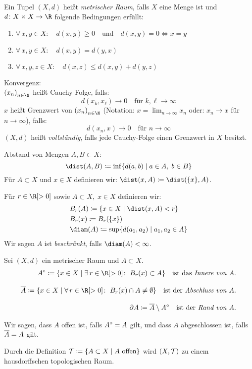 \begin{thEmpty}[Metrik]
    Ein Tupel $(X,d)$ heißt \emph{metrischer Raum}, falls $X$ eine Menge ist 
    und $d\colon X\times X\to\R$ folgende Bedingungen erfüllt:
    \begin{enumerate}[({M}1),leftmargin=2cm]
        \item
            $\forall\,x,y\in X\colon\quad
            d(x,y)\geq 0$~~und~~$d(x,y) = 0 \iff x=y$
        \item
            $\forall\,x,y\in X\colon\quad d(x,y) = d(y,x)$
        \item
            $\forall\,x,y,z\in X\colon\quad d(x,z)\leq d(x,y)+d(y,z)$
    \end{enumerate}
    
    Konvergenz:\\
    $\nSeq x$ heißt Cauchy-Folge, falls:
    \[ d(x_k,x_\ell) \to 0 \quad\text{für } k,\ell\to\infty \]
    $x$ heißt Grenzwert von $\nSeq x$ (Notation:
    $x=\lim_{n\to\infty} x_n$ oder: $x_n\to x$ für $n\to\infty$), falls:
    \[ d(x_n,x)\to 0 \quad\text{für } n\to\infty \]
    $(X,d)$ heißt \emph{vollständig}, falls jede Cauchy-Folge einen Grenzwert in
    $X$ besitzt.
    
    Abstand von Mengen $A,B\subset X$:
    \[ \dist(A,B) \defeq \inf \{ d(a,b) \Mid a\in A,\; b\in B \} \]
    Für $A\subset X$ und $x\in X$ definieren wir: $\dist(x,A) \defeq
    \dist(\{x\},A)$.
    
    Für $r\in\R[>0]$ sowie $A\subset X,\;x\in X$ definieren wir:
    \begin{align*}
        & B_r(A) \defeq \{ x\in X \Mid \dist(x,A) < r \}    \\
        & B_r(x) \defeq B_r(\{x\})                          \\
        & \diam(A) \defeq \sup \{ d(a_1,a_2) \Mid a_1,a_2\in A \}
    \end{align*}
    Wir sagen $A$ ist \emph{beschränkt}, falls $\diam(A)<\infty$.
\end{thEmpty}

\begin{thEmpty}\label{vl01:topometrik}
    Sei $(X,d)$ ein metrischer Raum und $A\subset X$.
    \begin{align*}
        \setinterior A \defeq \{ x\in X \Mid \exists\,r\in\R[>0]\colon\;
        B_r(x) \subset A \}
        \quad\text{ist das \emph{Innere von $A$}}.
        \\[2ex]
        \setclosure A \defeq \{ x\in X \Mid \forall\,r\in\R[>0]\colon\;
        B_r(x) \cap A \neq \emptyset \}
        \quad\text{ist der \emph{Abschluss von $A$}}.
        \\[2ex]
        \setboundary A \defeq \setclosure A \setminus \setinterior A
        \quad\text{ist der \emph{Rand von $A$}}.
    \end{align*}
    
    Wir sagen, dass $A$ offen ist, falls $A^\circ = A$ gilt,
    und dass $A$ abgeschlossen ist, falls $\overline{A} = A$ gilt.
    
    Durch die Definition $\Topo \defeq \{ A\subset X \Mid A\text{ offen} \}$
    wird $(X,\operatorname{\mathcal{T}})$ zu einem hausdorffschen topologischen Raum.
\end{thEmpty}
